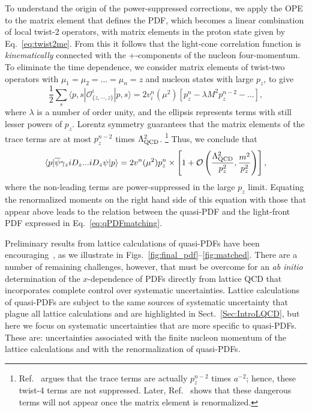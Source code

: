 To understand the origin of the power-suppressed corrections, we apply the OPE to the matrix element that defines the PDF, which becomes a linear combination of local twist-2 operators, with matrix elements in the proton state given by Eq.~\eqref{eq:twist2me}. From this it follows that the light-cone correlation function is {\it kinematically} connected with the +-components of the nucleon four-momentum. To eliminate the time dependence, we consider matrix elements of twist-two operators with $\mu_1=\mu_2=...=\mu_n=z$ and nucleon states with large $p_z$, to give
\begin{equation}
\frac{1}{2} \sum_s \langle p,s|\mathcal{O}^i_{\{z,\cdots,z\}}|p,s\rangle = 2v_i^n(\mu^2)\left[p_z^n-\lambda M^2 p_z^{n-2}-...\right], 
\end{equation}
where $\lambda$ is a number of order unity, and the ellipsis represents terms
with still lesser powers of $p_z$. Lorentz symmetry guarantees that the matrix elements of the trace terms are at most
$p_z^{n-2}$ times $\Lambda^2_{\rm QCD}$. \footnote{Ref.~\cite{Rossi:2017muf} argues that the trace terms are actually $p_z^{n-2}$ times $a^{-2}$; hence, these twist-4 terms are not suppressed. Later, Ref.~\cite{Ji:2017rah} shows that these dangerous terms will not appear once the matrix element is renormalized.}
 Thus, we conclude that
\begin{equation}
      \langle p| {\overline \psi}\gamma_ziD_z ... iD_z \psi|p\rangle
       = 2v^n(\mu^2) p_z^n\times \left[ 1 + {\cal O}\left(\frac{\Lambda^2_{\rm QCD}}{p_z^2},  \frac{m^2}{p_z^2}\right)\right],
\end{equation}
where the non-leading terms are power-suppressed in the large $p_z$ limit. Equating the renormalized moments on the right hand side of this equation with those that appear above
leads to the relation between the quasi-PDF and the light-front
PDF expressed in Eq.~\eqref{eq:qPDFmatching}.

Preliminary results from lattice calculations of quasi-PDFs have been encouraging~\cite{Lin:2014zya,Alexandrou:2015rja,Chen:2016utp,Alexandrou:2016jqi}, as we illustrate in Figs.~\ref{fig:final_pdf}--\ref{fig:matched}. There are a number of remaining challenges, however, that must be overcome for an {\it ab initio} determination of the $x$-dependence of PDFs directly from lattice QCD that incorporates complete control over systematic uncertainties. Lattice calculations of quasi-PDFs are subject to the same sources of systematic uncertainty that plague all lattice calculations and are highlighted in Sect.~\ref{Sec:IntroLQCD}, but here we focus on systematic uncertainties that are more specific to quasi-PDFs. These are: uncertainties associated with the finite nucleon momentum of the lattice calculations and with the renormalization of quasi-PDFs.

